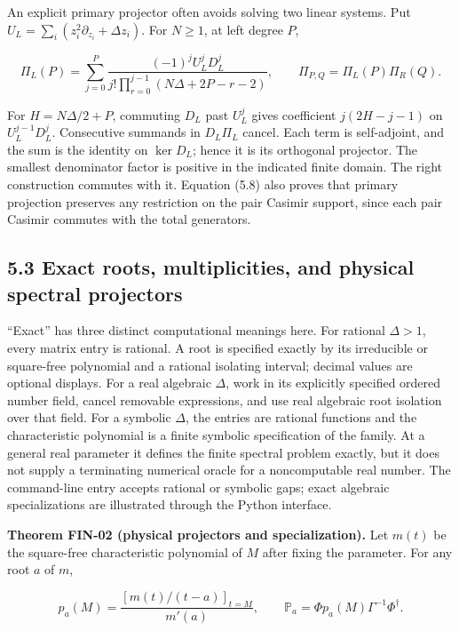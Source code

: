 An explicit primary projector often avoids solving two linear systems. Put \(U_L=\sum_i(z_i^2\partial_{z_i}+\Delta z_i)\). For \(N\ge1\), at left degree \(P\),

\[
\Pi_L(P)=\sum_{j=0}^{P}
\frac{(-1)^j U_L^jD_L^j}
{j!\prod_{r=0}^{j-1}(N\Delta+2P-r-2)},
\qquad \Pi_{P,Q}=\Pi_L(P)\Pi_R(Q).
\tag{5.8}
\]

For \(H=N\Delta/2+P\), commuting \(D_L\) past \(U_L^j\) gives coefficient \(j(2H-j-1)\) on \(U_L^{j-1}D_L^j\). Consecutive summands in \(D_L\Pi_L\) cancel. Each term is self-adjoint, and the sum is the identity on \(\ker D_L\); hence it is its orthogonal projector. The smallest denominator factor is positive in the indicated finite domain. The right construction commutes with it. Equation (5.8) also proves that primary projection preserves any restriction on the pair Casimir support, since each pair Casimir commutes with the total generators.

\hypertarget{exact-roots-multiplicities-and-physical-spectral-projectors}{%
\subsection{5.3 Exact roots, multiplicities, and physical spectral projectors}\label{exact-roots-multiplicities-and-physical-spectral-projectors}}

``Exact'' has three distinct computational meanings here. For rational \(\Delta>1\), every matrix entry is rational. A root is specified exactly by its irreducible or square-free polynomial and a rational isolating interval; decimal values are optional displays. For a real algebraic \(\Delta\), work in its explicitly specified ordered number field, cancel removable expressions, and use real algebraic root isolation over that field. For a symbolic \(\Delta\), the entries are rational functions and the characteristic polynomial is a finite symbolic specification of the family. At a general real parameter it defines the finite spectral problem exactly, but it does not supply a terminating numerical oracle for a noncomputable real number. The command-line entry accepts rational or symbolic gaps; exact algebraic specializations are illustrated through the Python interface.

\textbf{Theorem FIN-02 (physical projectors and specialization).} Let \(m(t)\) be the square-free characteristic polynomial of \(M\) after fixing the parameter. For any root \(a\) of \(m\),

\[
p_a(M)=\frac{[m(t)/(t-a)]_{t=M}}{m'(a)},
\qquad
\mathbb P_a=\Phi p_a(M)\Gamma^{-1}\Phi^\dagger.
\tag{5.9}
\]

